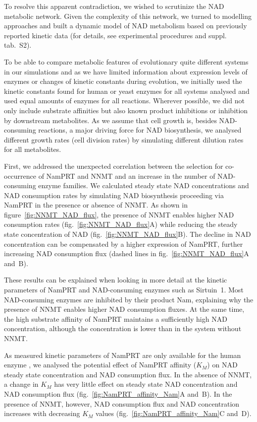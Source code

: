 To resolve this apparent contradiction, we wished to scrutinize the NAD metabolic network. Given the complexity of this network, we turned to modelling approaches and built a dynamic model of NAD metabolism based on previously reported kinetic data (for details, see experimental procedures and suppl. tab.~S2).

To be able to compare metabolic features of evolutionary quite different systems in our simulations and as we have limited information about expression levels of enzymes or changes of kinetic constants during evolution, we initially used the kinetic constants found for human or yeast enzymes for all systems analysed and used equal amounts of enzymes for all reactions. Wherever possible, we did not only include substrate affinities but also known product inhibitions or inhibition by downstream metabolites. As we assume that cell growth is, besides NAD-consuming reactions, a major driving force for NAD biosynthesis, we analysed different growth rates (cell division rates) by simulating different dilution rates for all metabolites.

First, we addressed the unexpected correlation between the selection for co-occurrence of NamPRT and NNMT and an increase in the number of NAD-consuming enzyme families. We calculated steady state NAD concentrations and NAD consumption rates by simulating NAD biosynthesis proceeding via NamPRT in the presence or absence of NNMT. As shown in figure~\ref{fig:NNMT_NAD_flux}, the presence of NNMT enables higher NAD consumption rates (fig.~\ref{fig:NNMT_NAD_flux}A) while reducing the steady state concentration of NAD (fig.~\ref{fig:NNMT_NAD_flux}B). The decline in NAD concentration can be compensated by a higher expression of NamPRT, further increasing NAD consumption flux (dashed lines in fig.~\ref{fig:NNMT_NAD_flux}A and~B).

These results can be explained when looking in more detail at the kinetic parameters of NamPRT and NAD-consuming enzymes such as Sirtuin~1. Most NAD-consuming enzymes are inhibited by their product Nam, explaining why the presence of NNMT enables higher NAD consumption fluxes. At the same time, the high substrate affinity of NamPRT maintains a sufficiently high NAD concentration, although the concentration is lower than in the system without NNMT.

As measured kinetic parameters of NamPRT are only available for the human enzyme \cite{Burgos2008}, we analysed the potential effect of NamPRT affinity ($K_{M}$) on NAD steady state concentration and NAD consumption flux. In the absence of NNMT, a change in $K_{M}$ has very little effect on steady state NAD concentration and NAD consumption flux (fig.~\ref{fig:NamPRT_affinity_Nam}A and~B). In the presence of NNMT, however, NAD consumption flux and NAD concentration increases with decreasing $K_{M}$ values (fig.~\ref{fig:NamPRT_affinity_Nam}C and~D).

